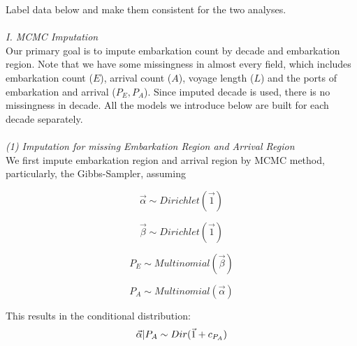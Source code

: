 \documentclass[preprint,12pt]{elsarticle}
\begin{document}
Label data below and make them consistent for the two analyses.\\
\\
\textit{I. MCMC Imputation}\\
\indent
Our primary goal is to impute embarkation count by decade and embarkation region. Note that we have some missingness in almost every field, which includes embarkation count ($E$), arrival count ($A$), voyage length ($L$) and the ports of embarkation and arrival ($P_E, P_A$). Since imputed decade is used, there is no missingness in decade. All the models we introduce below are built for each decade separately.\\
\\
\textit{(1) Imputation for missing Embarkation Region and Arrival Region}\\
\indent
We first impute embarkation region and arrival region by MCMC method, particularly, the Gibbs-Sampler, assuming

\begin{equation}
\vec{\alpha}  \sim Dirichlet(\vec{1})
\end{equation}

\begin{equation}
\vec{\beta}  \sim Dirichlet(\vec{1})
\end{equation}

\begin{equation}
P_E  \sim Multinomial(\vec{\beta})
\end{equation}

\begin{equation}
P_A  \sim Multinomial(\vec{\alpha})
\end{equation}

This results in the conditional distribution:
\begin{equation}
\vec{\alpha}|P_A \sim Dir(\vec{1}+c_{P_A})\\
\end{equation}
\end{document}
